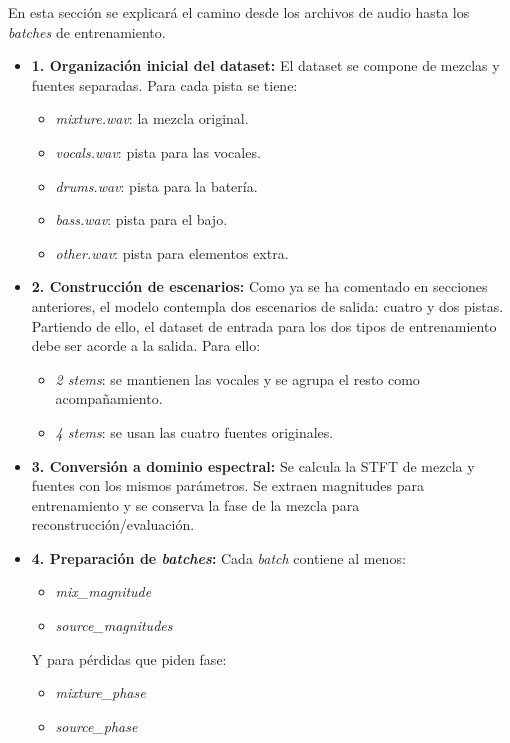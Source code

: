 En esta sección se explicará el camino desde los archivos de audio hasta los \textit{batches} de entrenamiento.

\begin{itemize}
    \item \textbf{1. Organización inicial del dataset:}
    El dataset se compone de mezclas y fuentes separadas. Para cada pista se tiene:
    \begin{itemize}
        \item \textit{mixture.wav}: la mezcla original.
        \item \textit{vocals.wav}: pista para las vocales.
        \item \textit{drums.wav}: pista para la batería.
        \item \textit{bass.wav}: pista para el bajo.
        \item \textit{other.wav}: pista para elementos extra. 
    \end{itemize}

    \item \textbf{2. Construcción de escenarios:}
    Como ya se ha comentado en secciones anteriores, el modelo contempla dos escenarios de salida: cuatro y dos pistas. Partiendo de ello, el dataset de entrada para los dos tipos de entrenamiento debe ser acorde a la salida. Para ello:

    \begin{itemize}
        \item \textit{2 stems}: se mantienen las vocales y se agrupa el resto como acompañamiento.
        \item \textit{4 stems}: se usan las cuatro fuentes originales.
    \end{itemize}

    \item \textbf{3. Conversión a dominio espectral:}
    Se calcula la STFT de mezcla y fuentes con los mismos parámetros. Se extraen magnitudes para entrenamiento y se conserva la fase de la mezcla para reconstrucción/evaluación.

    \item \textbf{4. Preparación de \textit{batches}:}
    Cada \textit{batch} contiene al menos:
    \begin{itemize}
        \item \textit{mix\_magnitude}
        \item \textit{source\_magnitudes}
    \end{itemize}
    
    Y para pérdidas que piden fase:
    \begin{itemize}
        \item \textit{mixture\_phase}
        \item \textit{source\_phase}
    \end{itemize}


\end{itemize}
